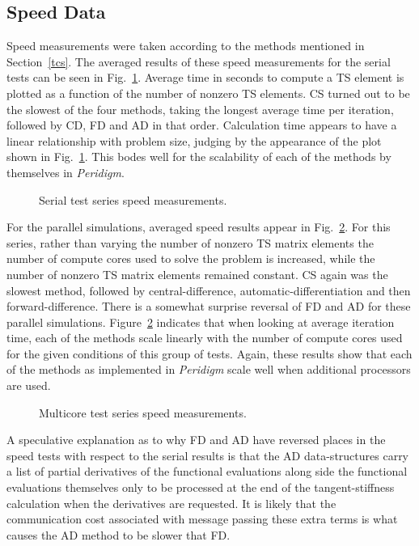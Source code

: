 \documentclass[preprint,12pt]{elsarticle}
\begin{document}
\subsection{Speed Data}
Speed measurements were taken according to the methods mentioned in Section~\ref{tcs}. The averaged results of these speed measurements for the serial tests can be seen in Fig.~\ref{fig:serial_speed}.  Average time in seconds to compute a TS element is plotted as a function of the number of nonzero TS elements.  CS turned out to be the slowest of the four methods, taking the longest average time per iteration,  followed by CD, FD and AD in that order. Calculation time appears to have a linear relationship with problem size, judging by the appearance of the plot shown in Fig.~\ref{fig:serial_speed}. This bodes well for the scalability of each of the methods by themselves in \emph{Peridigm}. 
%
\begin{figure}[tbp]
  \centering
  \scalebox{1.0}{}
  \caption{Serial test series speed measurements.}
  \label{fig:serial_speed}
\end{figure}
%
For the parallel simulations, averaged speed results appear in Fig.~\ref{fig:multi_speed}. For this series, rather than varying the number of nonzero TS matrix elements the number of compute cores used to solve the problem is increased, while the number of nonzero TS matrix elements remained constant.  CS again was the slowest method, followed by central-difference, automatic-differentiation and then forward-difference.  There is a somewhat surprise reversal of FD and AD for these parallel simulations.  Figure~\ref{fig:multi_speed} indicates that when looking at average iteration time, each of the methods scale linearly with the number of compute cores used for the given conditions of this group of tests. Again, these results show that each of the methods as implemented in \emph{Peridigm} scale well when additional processors are used. 
%
\begin{figure}[tbp]
  \centering
  \scalebox{1.0}{}
  \caption{Multicore test series speed measurements.}
  \label{fig:multi_speed}
\end{figure}
%
A speculative explanation as to why FD and AD have reversed places in the speed tests with respect to the serial results is that the AD data-structures carry a list of partial derivatives of the functional evaluations along side the functional evaluations themselves only to be processed at the end of the tangent-stiffness calculation when the derivatives are requested.  It is likely that the communication cost associated with message passing these extra terms is what causes the AD method to be slower that FD.
\end{document}
